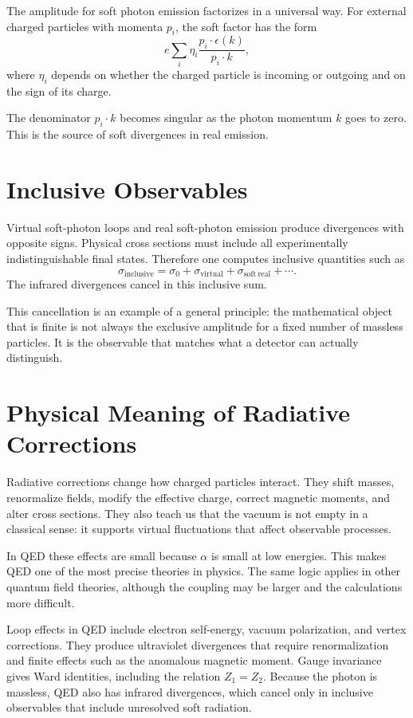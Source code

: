 The amplitude for soft photon emission factorizes in a universal way. For
external charged particles with momenta \(p_i\), the soft factor has the form
\[
    e\sum_i \eta_i\frac{p_i\cdot\epsilon(k)}{p_i\cdot k},
\]
where \(\eta_i\) depends on whether the charged particle is incoming or outgoing
and on the sign of its charge.

The denominator \(p_i\cdot k\) becomes singular as the photon momentum \(k\) goes
to zero. This is the source of soft divergences in real emission.

\section{Inclusive Observables}

Virtual soft-photon loops and real soft-photon emission produce divergences with
opposite signs. Physical cross sections must include all experimentally
indistinguishable final states. Therefore one computes inclusive quantities such
as
\[
    \sigma_{\mathrm{inclusive}}
    = \sigma_{0}+\sigma_{\mathrm{virtual}}+\sigma_{\mathrm{soft\ real}}+\cdots.
\]
The infrared divergences cancel in this inclusive sum.

This cancellation is an example of a general principle: the mathematical object
that is finite is not always the exclusive amplitude for a fixed number of
massless particles. It is the observable that matches what a detector can
actually distinguish.

\section{Physical Meaning of Radiative Corrections}

Radiative corrections change how charged particles interact. They shift masses,
renormalize fields, modify the effective charge, correct magnetic moments, and
alter cross sections. They also teach us that the vacuum is not empty in a
classical sense: it supports virtual fluctuations that affect observable
processes.

In QED these effects are small because \(\alpha\) is small at low energies. This
makes QED one of the most precise theories in physics. The same logic applies in
other quantum field theories, although the coupling may be larger and the
calculations more difficult.

\begin{summarybox}
Loop effects in QED include electron self-energy, vacuum polarization, and vertex
corrections. They produce ultraviolet divergences that require renormalization
and finite effects such as the anomalous magnetic moment. Gauge invariance gives
Ward identities, including the relation \(Z_1=Z_2\). Because the photon is
massless, QED also has infrared divergences, which cancel only in inclusive
observables that include unresolved soft radiation.
\end{summarybox}

